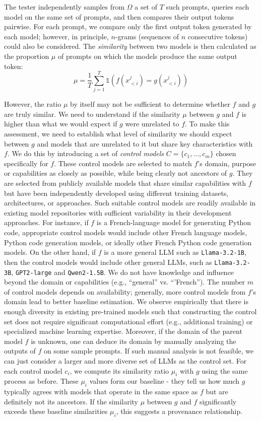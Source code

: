 The tester independently samples from $\Omega$ a set of $T$ such prompts, queries each model on the same set of prompts, and then compares their output tokens pairwise. For each prompt, we compare only the first output token generated by each model; however, in principle, $n$-grams (sequences of $n$ consecutive tokens) could also be considered. The \emph{similarity} between two models is then calculated as the proportion $\mu$ of prompts on which the models produce the same output token:
$$\mu=\frac{1}{T}\sum_{j=1}^T \mathds{1}(f(x_{<i}^j)=g(x_{<i}^j))$$



%

However, the ratio $\mu$ by itself may not be sufficient to determine whether $f$ and $g$ are truly similar. We need to understand if the similarity $\mu$ between $g$ and $f$ is higher than what we would expect if $g$ were unrelated to $f$. To make this assessment, we need to establish what level of similarity we should expect between $g$ and models that are unrelated to it but share key characteristics with $f$.
%
We do this by introducing a set of \emph{control models} $C=\{c_1, \ldots, c_m\}$ chosen specifically for $f$. These control models are selected to match $f$'s domain, purpose or capabilities as closely as possible, while being clearly not ancestors of $g$. 
%
They are selected from publicly available models that share similar capabilities with $f$ but have been independently developed using different training datasets, architectures, or approaches. Such suitable control models are readily available in existing model repositories with sufficient variability in their development approaches. 
For instance, if $f$ is a French-language model for generating Python code, appropriate control models would include other French language models, Python code generation models, or ideally other French Python code generation models.
%
On the other hand, if $f$ is a more general LLM such as \texttt{Llama-3.2-1B}, then the control models would include other general LLMs, such as \texttt{Llama-3.2-3B}, \texttt{GPT2-large} and \texttt{Qwen2-1.5B}.
We do not have knowledge and influence beyond the domain or capabilities (e.g., ``general'' vs. ``'French'').
%
The number $m$ of control models depends on availability; generally, more control models from $f$'s domain lead to better baseline estimation. We observe empirically that there is enough diversity in existing pre-trained models such that constructing the control set does not require significant computational effort (e.g., additional training) or specialized machine learning expertise. Moreover, if the domain of the parent model $f$ is unknown, one can deduce its domain by manually analyzing the outputs of $f$ on some sample prompts. If such manual analysis is not feasible, we can just consider a larger and more diverse set of LLMs as the control set.
%
For each control model $c_i$, we compute its similarity ratio $\mu_i$ with $g$ using the same process as before. These $\mu_i$ values form our baseline - they tell us how much $g$ typically agrees with models that operate in the same space as $f$ but are definitely not its ancestors. If the similarity $\mu$ between $g$ and $f$ significantly exceeds these baseline similarities $\mu_i$, this suggests a provenance relationship. 


